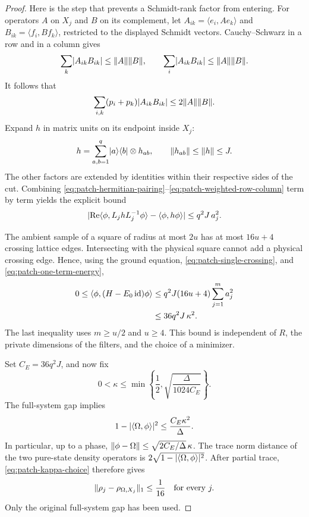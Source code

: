 \begin{proof}
Here is the step that prevents a Schmidt-rank factor from entering.
For operators \(A\) on \(X_j\) and \(B\) on its complement,
let \(A_{ik}=\langle e_i,Ae_k\rangle\) and
\(B_{ik}=\langle f_i,Bf_k\rangle\), restricted to the displayed
Schmidt vectors.  Cauchy--Schwarz in a row and in a column gives
\[
 \sum_k\lvert A_{ik}B_{ik}\rvert\leq\lVert A\rVert\lVert B\rVert,
 \qquad
 \sum_i\lvert A_{ik}B_{ik}\rvert\leq\lVert A\rVert\lVert B\rVert.
\]
It follows that
\begin{equation}
 \sum_{i,k}(p_i+p_k)\lvert A_{ik}B_{ik}\rvert
       \leq2\lVert A\rVert\lVert B\rVert.
 \label{eq:patch-weighted-row-column}
\end{equation}
Expand \(h\) in matrix units on its endpoint inside \(X_j\):
\[
 h=\sum_{a,b=1}^q
       \lvert a\rangle\langle b\rvert\otimes h_{ab},
 \qquad \lVert h_{ab}\rVert\leq\lVert h\rVert\leq J.
\]
The other factors are extended by identities within their respective
sides of the cut.  Combining
\eqref{eq:patch-hermitian-pairing}--\eqref{eq:patch-weighted-row-column}
term by term yields the explicit bound
\begin{equation}
 \lvert \operatorname{Re}\langle\phi,L_j h L_j^{-1}\phi\rangle
                  -\langle\phi,h\phi\rangle\rvert
       \leq q^2J\,a_j^2.
 \label{eq:patch-one-term-energy}
\end{equation}

The ambient sample of a square of radius at most \(2u\) has at most
\(16u+4\) crossing lattice edges.  Intersecting with the physical
square cannot add a physical crossing edge.  Hence, using the
ground equation, \eqref{eq:patch-single-crossing}, and
\eqref{eq:patch-one-term-energy},
\begin{align}
 0\leq\langle\phi,(H-E_0\operatorname{id})\phi\rangle
 &\leq q^2J(16u+4)\sum_{j=1}^m a_j^2 \notag\\
 &\leq 36q^2J\,\kappa^2.
 \label{eq:patch-energy-bound}
\end{align}
The last inequality uses \(m\geq u/2\) and \(u\geq4\).
This bound is independent of \(R\), the private dimensions of the
filters, and the choice of a minimizer.

Set \(C_E=36q^2J\), and now fix
\begin{equation}
 0<\kappa\leq
 \min\left\{\frac12,\sqrt{\frac{\Delta}{1024C_E}}\right\}.
 \label{eq:patch-kappa-choice}
\end{equation}
The full-system gap implies
\[
 1-\lvert \langle\Omega,\phi\rangle\rvert^2
       \leq \frac{C_E\kappa^2}{\Delta}.
\]
In particular, up to a phase,
\(\lVert \phi-\Omega\rVert\leq
\sqrt{2C_E/\Delta}\,\kappa\).
The trace norm distance of the two pure-state density operators is
\(2\sqrt{1-\lvert \langle\Omega,\phi\rangle\rvert^2}\).
After partial trace, \eqref{eq:patch-kappa-choice} therefore gives
\begin{equation}
 \lVert \rho_j-\rho_{\Omega,X_j}\rVert_1\leq\frac1{16}
 \quad\hbox{for every }j.
 \label{eq:patch-marginal-closeness}
\end{equation}
Only the original full-system gap has been used.


\end{proof}
